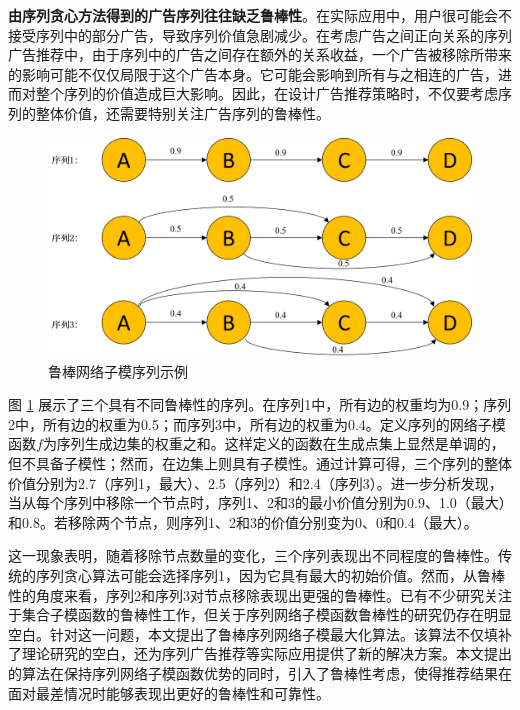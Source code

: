 \textbf{由序列贪心方法得到的广告序列往往缺乏鲁棒性}。在实际应用中，用户很可能会不接受序列中的部分广告，导致序列价值急剧减少。在考虑广告之间正向关系的序列广告推荐中，由于序列中的广告之间存在额外的关系收益，一个广告被移除所带来的影响可能不仅仅局限于这个广告本身。它可能会影响到所有与之相连的广告，进而对整个序列的价值造成巨大影响。因此，在设计广告推荐策略时，不仅要考虑序列的整体价值，还需要特别关注广告序列的鲁棒性。

\begin{figure}[th]
    \centering
    \includegraphics[width=.89\linewidth]{figure/rosenets/sample1}
    \caption{鲁棒网络子模序列示例}
    \label{fig:robust_sample}
\end{figure}

图 \ref{fig:robust_sample} 展示了三个具有不同鲁棒性的序列。在序列1中，所有边的权重均为0.9；序列2中，所有边的权重为0.5；而序列3中，所有边的权重为0.4。定义序列的网络子模函数$f$为序列生成边集的权重之和。这样定义的函数在生成点集上显然是单调的，但不具备子模性；然而，在边集上则具有子模性。通过计算可得，三个序列的整体价值分别为2.7（序列1，最大）、2.5（序列2）和2.4（序列3）。进一步分析发现，当从每个序列中移除一个节点时，序列1、2和3的最小价值分别为0.9、1.0（最大）和0.8。若移除两个节点，则序列1、2和3的价值分别变为0、0和0.4（最大）。

这一现象表明，随着移除节点数量的变化，三个序列表现出不同程度的鲁棒性。传统的序列贪心算法\cite{tschiatschek2017selecting,mitrovic2018submodularity}可能会选择序列1，因为它具有最大的初始价值。然而，从鲁棒性的角度来看，序列2和序列3对节点移除表现出更强的鲁棒性。已有不少研究关注于集合子模函数的鲁棒性工作\cite{orlin2018robust,bogunovic2017robust,mitrovic2017streaming,tzoumas2017resilient}，但关于序列网络子模函数鲁棒性的研究仍存在明显空白。针对这一问题，本文提出了鲁棒序列网络子模最大化算法。该算法不仅填补了理论研究的空白，还为序列广告推荐等实际应用提供了新的解决方案。本文提出的算法在保持序列网络子模函数优势的同时，引入了鲁棒性考虑，使得推荐结果在面对最差情况时能够表现出更好的鲁棒性和可靠性。

